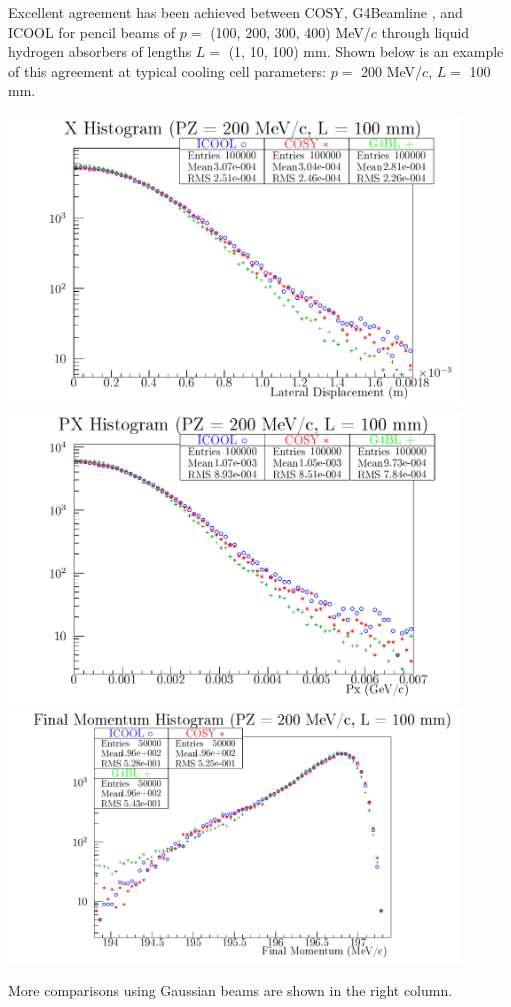\documentclass[portrait,a0paper,fontscale=0.285]{baposter} %
\begin{document}
\begin{poster}
{Excellent agreement has been achieved between COSY, G4Beamline \cite{g4bl}, and ICOOL \cite{icool} for pencil beams of $p=$ (100, 200, 300, 400) MeV/$c$ through liquid hydrogen absorbers of lengths $L =$ (1, 10, 100) mm. Shown below is an example of this agreement at typical cooling cell parameters: $p =$ 200 MeV/$c$, $L =$ 100 mm.
\begin{center}
\includegraphics[width=0.9\textwidth]{Figures/LH.X.200.100.png}
\includegraphics[width=0.9\textwidth]{Figures/LH.PX.200.100.png}
\includegraphics[width=0.9\textwidth]{Figures/LH.strag.200.100.png}
\end{center}
More comparisons using Gaussian beams are shown in the right column.
}


\end{poster}
\end{document}
